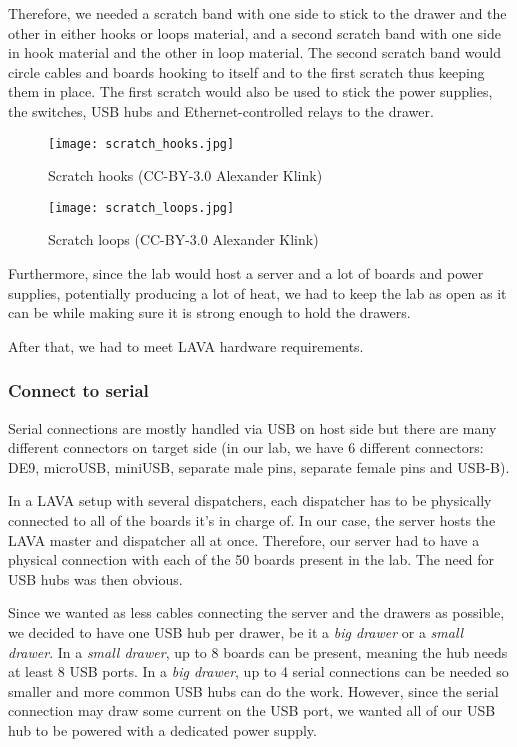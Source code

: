 Therefore, we needed a scratch band with one side to stick to the drawer and the other in either hooks or loops material, and a second scratch band with one side in hook material and the other in loop material. The second scratch band would circle cables and boards hooking to itself and to the first scratch thus keeping them in place. The first scratch would also be used to stick the power supplies, the switches, USB hubs and Ethernet-controlled relays to the drawer.

\begin{figure}[H]
  \centering
  \begin{minipage}[b]{0.45\textwidth}
    \texttt{[image: scratch\_hooks.jpg]}
    \caption{Scratch hooks (CC-BY-3.0 Alexander Klink)}
  \end{minipage}
  \hfill
  \begin{minipage}[b]{0.45\textwidth}
    \texttt{[image: scratch\_loops.jpg]}
    \caption{Scratch loops (CC-BY-3.0 Alexander Klink)}
  \end{minipage}
\end{figure}

Furthermore, since the lab would host a server and a lot of boards and power supplies, potentially producing a lot of heat, we had to keep the lab as open as it can be while making sure it is strong enough to hold the drawers.

After that, we had to meet LAVA hardware requirements.

\subsubsection{Connect to serial}

Serial connections are mostly handled via USB on host side but there are many different connectors on target side (in our lab, we have 6 different connectors: DE9, microUSB, miniUSB, separate male pins, separate female pins and USB-B).

In a LAVA setup with several dispatchers, each dispatcher has to be physically connected to all of the boards it's in charge of. In our case, the server hosts the LAVA master and dispatcher all at once. Therefore, our server had to have a physical connection with each of the 50 boards present in the lab. The need for USB hubs was then obvious.

Since we wanted as less cables connecting the server and the drawers as possible, we decided to have one USB hub per drawer, be it a \textit{big drawer} or a \textit{small drawer}. In a \textit{small drawer}, up to 8 boards can be present, meaning the hub needs at least 8 USB ports. In a \textit{big drawer}, up to 4 serial connections can be needed so smaller and more common USB hubs can do the work. However, since the serial connection may draw some current on the USB port, we wanted all of our USB hub to be powered with a dedicated power supply.

